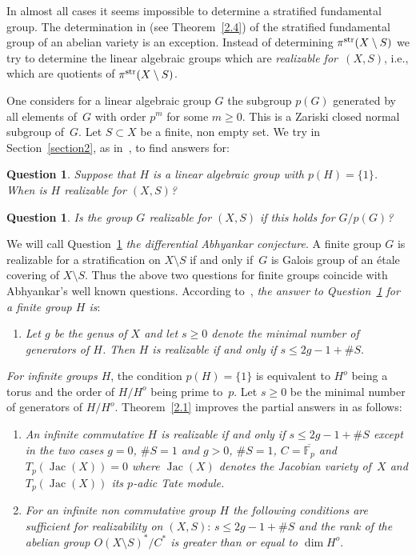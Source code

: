 \documentclass[pdftex]{sigma}
\numberwithin{equation}{section}
\newtheorem{Question}[Theorem]{Question}
{\theoremstyle{definition}
\newtheorem{Definition}[Theorem]{Definition}
\newtheorem{Example}[Theorem]{Example}
\newtheorem{Remark}[Theorem]{Remark}
\newtheorem{Remarks}[Theorem]{Remarks}
\newtheorem{Observations}[Theorem]{Obervations}
\newtheorem{Observation}[Theorem]{Observation}
\newtheorem{Examples}[Theorem]{Examples}
\newtheorem{Comments}[Theorem]{Comments}}
\begin{document}
In almost all cases it seems impossible to determine a stratified fundamental group. The determination in \cite[Section~3]{Sa} (see Theorem~\ref{2.4}) of the stratified fundamental group of an abelian variety is an exception. Instead of determining $\pi^{\rm str}(X\setminus S)$ we try to determine the linear algebraic groups which are {\it realizable for~$(X,S)$}, i.e., which are quotients of $\pi^{\rm str}(X\setminus S)$.

 One considers for a linear algebraic group $G$ the subgroup $p(G)$ generated by all elements of~$G$ with order $p^m$ for some $m\geq 0$. This is a Zariski closed normal subgroup of~$G$. Let $S\subset X$ be a finite, non empty set. We try in Section~\ref{section2}, as in~\cite{Ma-vdP1}, to find answers for:

\begin{Question}\label{Question1} Suppose that $H$ is a linear algebraic group with $p(H)=\{1\}$. When is $H$ rea\-li\-zable for $(X,S)$?
\end{Question}

\begin{Question}\label{Question2} Is the group $G$ realizable for $(X,S)$ if this holds for $G/p(G)$?
\end{Question}

We will call Question~\ref{Question2} {\it the differential Abhyankar conjecture}. A finite group $G$ is realizable for a stratification on $X\setminus S$ if and only if~$G$ is Galois group of an \'etale covering of $X\setminus S$. Thus the above two questions for finite groups coincide with Abhyankar's well known questions. According to~\cite{SGA1}, {\it the answer to Question~{\rm \ref{Question1}} for a finite group $H$ is}:
\begin{enumerate}\itemsep=0pt
\item[(a)] {\it Let $g$ be the genus of $X$ and let $s\geq 0$ denote the minimal number of generators of $H$. Then $H$ is realizable if and only if $s\leq 2g-1+\#S$}.
\end{enumerate}
{\it For infinite groups $H$}, the condition $p(H)=\{1\}$ is equivalent to $H^o$ being a torus and the order of $H/H^o$ being prime to~$p$. Let $s\geq 0$ be the minimal number of generators of $H/H^o$. Theorem~\ref{2.1} improves the partial answers in \cite[Theorems~7.1 and~7.2]{Ma-vdP1} as follows:
\begin{enumerate}\itemsep=0pt
\item[(b)] {\it An infinite commutative $H$ is realizable if and only if $s\leq 2g-1+\#S$ except in the two cases
 $g=0$, $\#S=1$ and $g>0$, $\# S=1$, $C=\overline{\mathbb{F}_p}$ and $T_p(\operatorname{Jac}(X))=0$ where $\operatorname{Jac}(X)$ denotes the Jacobian variety of~$X$ and $T_p(\operatorname{Jac}(X))$ its $p$-adic Tate module.}
\item[(c)] {\it For an infinite non commutative group $H$ the following conditions are sufficient for reali\-za\-bility on $(X,S)$}: {\it $s\leq 2g-1+\#S$ and
 the rank of the abelian group $O(X\setminus S)^*/C^*$ is greater than or equal to $\dim H^o$}.
\end{enumerate}
\end{document}
